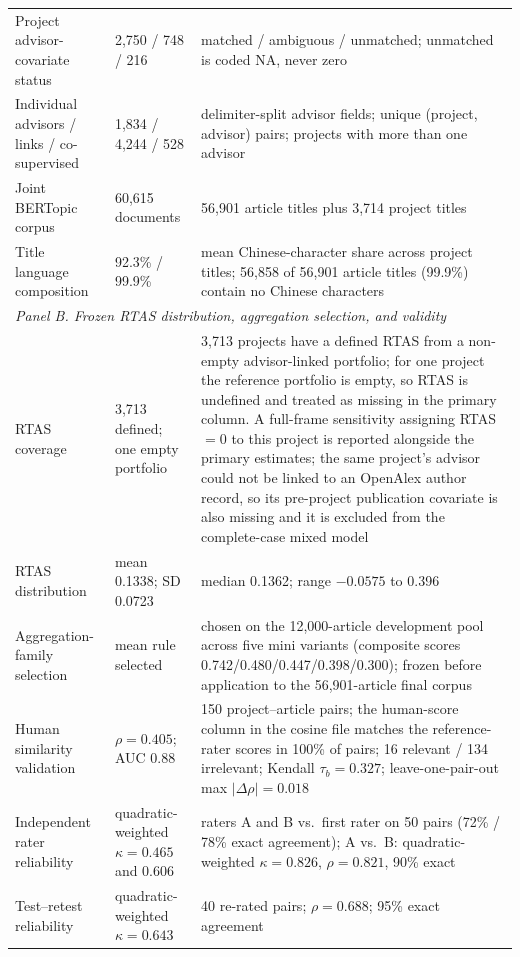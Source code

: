 \documentclass[a4paper,11pt]{article}
\begin{document}
\begin{table}[H]
\begin{tabular}{p{1.55in}p{1.05in}p{3.15in}}
Project advisor-covariate status & 2,750 / 748 / 216 & matched / ambiguous / unmatched; unmatched is coded NA, never zero\\
Individual advisors / links / co-supervised & 1,834 / 4,244 / 528 & delimiter-split advisor fields; unique (project, advisor) pairs; projects with more than one advisor\\
Joint BERTopic corpus & 60,615 documents & 56,901 article titles plus 3,714 project titles\\
Title language composition & 92.3\% / 99.9\% & mean Chinese-character share across project titles; 56,858 of 56,901 article titles (99.9\%) contain no Chinese characters\\
\midrule
\multicolumn{3}{l}{\textit{Panel B. Frozen RTAS distribution, aggregation selection, and validity}}\\
\midrule
RTAS coverage & 3,713 defined; one empty portfolio & 3,713 projects have a defined RTAS from a non-empty advisor-linked portfolio; for one project the reference portfolio is empty, so RTAS is undefined and treated as missing in the primary column. A full-frame sensitivity assigning RTAS $=0$ to this project is reported alongside the primary estimates; the same project's advisor could not be linked to an OpenAlex author record, so its pre-project publication covariate is also missing and it is excluded from the complete-case mixed model\\
RTAS distribution & mean 0.1338; SD 0.0723 & median 0.1362; range $-0.0575$ to 0.396\\
Aggregation-family selection & mean rule selected & chosen on the 12,000-article development pool across five mini variants (composite scores 0.742/0.480/0.447/0.398/0.300); frozen before application to the 56,901-article final corpus\\
Human similarity validation & $\rho=0.405$; AUC 0.88 & 150 project--article pairs; the human-score column in the cosine file matches the reference-rater scores in 100\% of pairs; 16 relevant / 134 irrelevant; Kendall $\tau_b=0.327$; leave-one-pair-out max $|\Delta\rho|=0.018$\\
Independent rater reliability & quadratic-weighted $\kappa=0.465$ and 0.606 & raters A and B vs.\ first rater on 50 pairs (72\% / 78\% exact agreement); A vs.\ B: quadratic-weighted $\kappa=0.826$, $\rho=0.821$, 90\% exact\\
Test--retest reliability & quadratic-weighted $\kappa=0.643$ & 40 re-rated pairs; $\rho=0.688$; 95\% exact agreement\\

\end{tabular}
\end{table}
\end{document}
